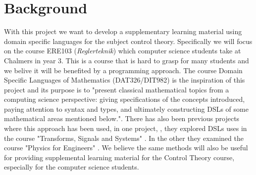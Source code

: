 \section{Background}
With this project we want to develop a supplementary learning material using domain specific languages for the subject control theory. Specifically we will focus on the course ERE103 (\textit{Reglerteknik}) which computer science students take at Chalmers in year 3. This is a course that is hard to grasp for many students and we belive it will be benefited by a programming approach. The course Domain Specific Languages of Mathematics (DAT326/DIT982) is the inspiration of this project and its purpose is to "present classical mathematical topics from a computing science perspective: giving specifications of the concepts introduced, paying attention to syntax and types, and ultimately constructing DSLs of some mathematical areas mentioned below.". There has also been previous projects where this approach has been used, in one project, \cite{tssarbete}, they explored DSLs uses in the course "Transforms, Signals and Systems" . In the other they examined the course "Physics for Engineers" \cite{fysikarbete}. %
We believe the same methods will also be useful for providing supplemental learning material for the Control Theory course, especially for the computer science students.
\iffalse
Anteckningar(Slids):

Vad är ämnet/problemet som ska undersökas? 
Varför har ämnet/problemet uppkommit? 
Varför är det ett relevant eller intressant ämne/problem? 
För vem? 
Kan det specifika ämnet/problemet relateras till en mer generell diskussion?
\fi